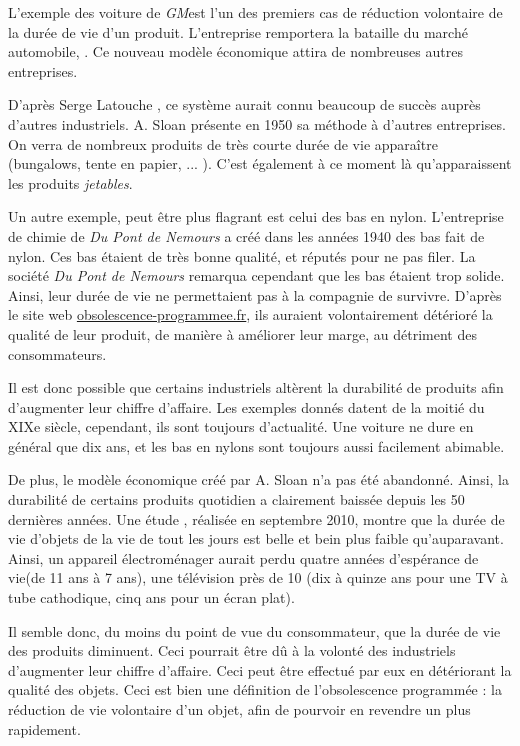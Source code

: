 \smallbreak
L'exemple des voiture de \textit{GM}est l'un des premiers cas de réduction volontaire de la durée de vie d'un produit. L'entreprise remportera la bataille du marché automobile, .
Ce nouveau modèle économique attira de nombreuses autres entreprises. 

D'après Serge Latouche \cite{bpc}, ce système aurait connu beaucoup de succès auprès d'autres industriels. A. Sloan présente en 1950 sa méthode à d'autres entreprises. On verra de nombreux produits de très courte durée de vie apparaître (bungalows, tente en papier, ... ). C'est également à ce moment là qu'apparaissent les produits \textit{jetables}.

Un autre exemple, peut être plus flagrant est celui des bas en nylon.
L'entreprise de chimie de \textit{Du Pont de Nemours} a créé dans les années 1940 des bas fait de nylon.
Ces bas étaient de très bonne qualité, et réputés pour ne pas filer. La société \textit{Du Pont de Nemours} remarqua cependant que les bas étaient trop solide. 
Ainsi, leur durée de vie ne permettaient pas à la compagnie de survivre.
D'après le site web \url{obsolescence-programmee.fr}, ils auraient volontairement détérioré la qualité de leur produit, de manière à améliorer leur marge, au détriment des consommateurs. 

\smallbreak

Il est donc possible que certains industriels altèrent la durabilité de produits afin d'augmenter leur chiffre d'affaire. Les exemples donnés datent de la moitié du XIXe siècle, cependant, ils sont toujours d'actualité. Une voiture ne dure en général que dix ans, et les bas en nylons sont toujours aussi facilement abimable. 

De plus, le modèle économique créé par A. Sloan n'a pas été abandonné. Ainsi, la durabilité de certains produits quotidien a clairement baissée depuis les 50 dernières années. 
Une étude \cite{opSsg}, réalisée en septembre 2010, montre que la durée de vie d'objets de la vie de tout les jours est belle et bein plus faible qu'auparavant.
Ainsi, un appareil électroménager aurait perdu quatre années d'espérance de vie(de 11 ans à 7 ans), une télévision près de 10 (dix à quinze ans pour une TV à tube cathodique, cinq ans pour un écran plat). 

Il semble donc, du moins du point de vue du consommateur, que la durée de vie des produits diminuent. Ceci pourrait être dû à la volonté des industriels d'augmenter leur chiffre d'affaire. Ceci peut être effectué par eux en détériorant la qualité des objets. Ceci est bien une définition de l'obsolescence programmée : la réduction de vie volontaire d'un objet, afin de pourvoir en revendre un plus rapidement. 
